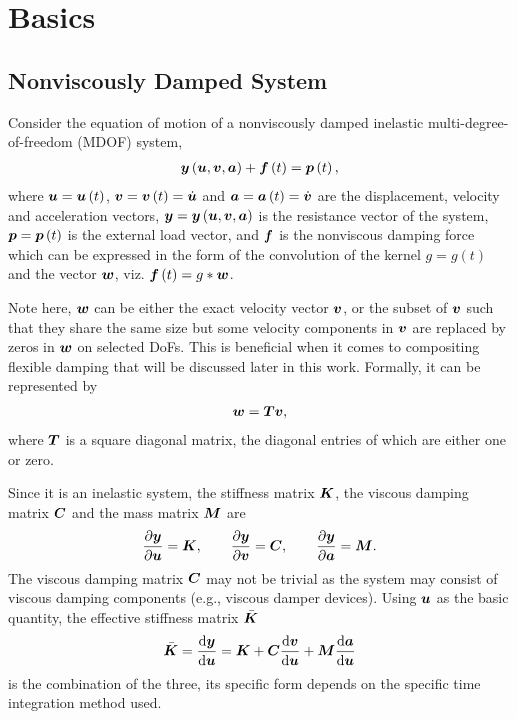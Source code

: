 \section{Basics}
\subsection{Nonviscously Damped System}
Consider the equation of motion of a nonviscously damped inelastic multi-degree-of-freedom (MDOF) system,
\begin{gather}\label{eq:eom}
\bm{y}\left(\bm{u},\bm{v},\bm{a}\right)+\bm{f}\left(t\right)=\bm{p}\left(t\right),
\end{gather}
where $\bm{u}=\bm{u}\left(t\right)$, $\bm{v}=\bm{v}\left(t\right)=\dot{\bm{u}}$ and $\bm{a}=\bm{a}\left(t\right)=\dot{\bm{v}}$ are the displacement, velocity and acceleration vectors, $\bm{y}=\bm{y}\left(\bm{u},\bm{v},\bm{a}\right)$ is the resistance vector of the system, $\bm{p}=\bm{p}\left(t\right)$ is the external load vector, and $\bm{f}$ is the nonviscous damping force which can be expressed in the form of the convolution of the kernel $g=g\left(t\right)$ and the vector $\bm{w}$, viz. $\bm{f}\left(t\right)=g*\bm{w}$.

Note here, $\bm{w}$ can be either the exact velocity vector $\bm{v}$, or the subset of $\bm{v}$ such that they share the same size but some velocity components in $\bm{v}$ are replaced by zeros in $\bm{w}$ on selected DoFs. This is beneficial when it comes to compositing flexible damping that will be discussed later in this work. Formally, it can be represented by
\begin{gather}
\bm{w}=\bm{T}\bm{v},
\end{gather}
where $\bm{T}$ is a square diagonal matrix, the diagonal entries of which are either one or zero.

Since it is an inelastic system, the stiffness matrix $\bm{K}$, the viscous damping matrix $\bm{C}$ and the mass matrix $\bm{M}$ are
\begin{gather}
\dfrac{\partial{\bm{y}}}{\partial{\bm{u}}}=\bm{K},\qquad
\dfrac{\partial{\bm{y}}}{\partial{\bm{v}}}=\bm{C},\qquad
\dfrac{\partial{\bm{y}}}{\partial{\bm{a}}}=\bm{M}.
\end{gather}
The viscous damping matrix $\bm{C}$ may not be trivial as the system may consist of viscous damping components (e.g., viscous damper devices). Using $\bm{u}$ as the basic quantity, the effective stiffness matrix $\bar{\bm{K}}$
\begin{gather}
\bar{\bm{K}}=\dfrac{\mathrm{d}\bm{y}}{\mathrm{d}\bm{u}}=\bm{K}+\bm{C}\dfrac{\mathrm{d}\bm{v}}{\mathrm{d}\bm{u}}+\bm{M}\dfrac{\mathrm{d}\bm{a}}{\mathrm{d}\bm{u}}
\end{gather}
is the combination of the three, its specific form depends on the specific time integration method used.
